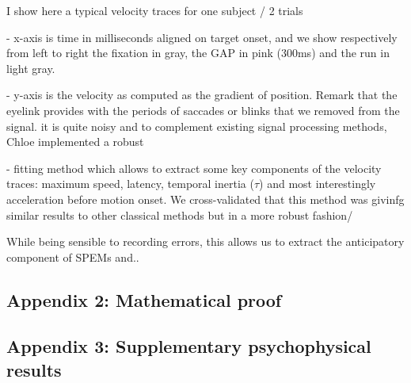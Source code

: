 \documentclass[profile,final,english, draft]{article}%
\newcommand{\Jj}{\mathcal{J}}
\newcommand{\seeApp}[1]{Appendix~\ref{app:#1}}
\begin{document}
I show here a typical velocity traces for one subject / 2 trials

- x-axis is time in milliseconds aligned on target onset,
and we show respectively from left to right the fixation in gray,
the GAP in pink (300ms) and the run in light gray.

- y-axis is the velocity as computed as the gradient of position.
Remark that the eyelink provides with the periods of saccades or
 blinks that we removed from the signal. it is quite noisy and
 to complement existing signal processing methods,
 Chloe implemented a robust

- fitting method which allows to extract some key components of
the velocity traces: maximum speed, latency, temporal inertia ($\tau$)
 and most interestingly acceleration before motion onset.
 We cross-validated that this method was givinfg similar results
  to other classical methods but in a more robust fashion/

While being sensible to recording errors, this allows us to extract the
 anticipatory component of SPEMs and..


\subsection{Appendix 2: Mathematical proof}
\label{app:bcp}

\subsection{Appendix 3: Supplementary psychophysical results}
\label{app:results_psycho}

{\tiny
\printbibliography
}
\end{document}
